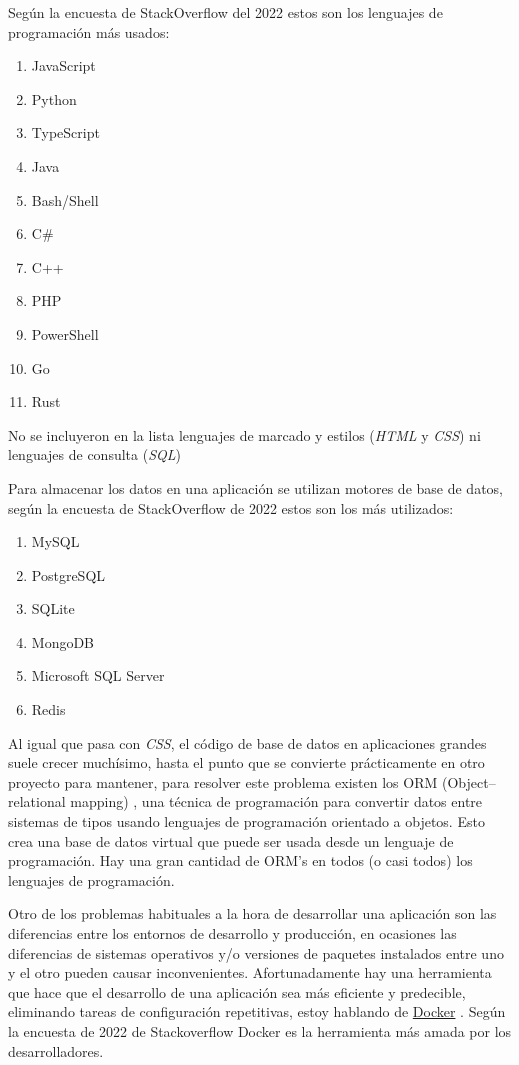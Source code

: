 Según la encuesta de StackOverflow del 2022 \cite{encuesta2022} estos son los lenguajes de programación más usados: 
\begin{enumerate}
	\item JavaScript
	\item Python
	\item TypeScript
	\item Java
	\item Bash/Shell
	\item C\#
	\item C++
	\item PHP
	\item PowerShell
	\item Go
	\item Rust
\end{enumerate}
No se incluyeron en la lista lenguajes de marcado y estilos (\textit{HTML} y \textit{CSS}) ni lenguajes de consulta (\textit{SQL})
\newline

Para almacenar los datos en una aplicación se utilizan motores de base de datos, según la encuesta de StackOverflow de 2022 \cite{encuesta2022} estos son los más utilizados:
\begin{enumerate}
	\item MySQL
	\item PostgreSQL
	\item SQLite
	\item MongoDB
	\item Microsoft SQL Server
	\item Redis
\end{enumerate}

Al igual que pasa con \textit{CSS}, el código de base de datos en aplicaciones grandes suele crecer muchísimo, hasta el punto que se convierte prácticamente en otro proyecto para mantener, para resolver este problema existen los ORM (Object–relational mapping) \cite{orm}, una técnica de programación para convertir datos entre sistemas de tipos usando lenguajes de programación orientado a objetos. Esto crea una base de datos virtual que puede ser usada desde un lenguaje de programación. Hay una gran cantidad de ORM's en todos (o casi todos) los lenguajes de programación.
\newline

Otro de los problemas habituales a la hora de desarrollar una aplicación son las diferencias entre los entornos de desarrollo y producción, en ocasiones las diferencias de sistemas operativos y/o versiones de paquetes instalados entre uno y el otro pueden causar inconvenientes. Afortunadamente hay una herramienta que hace que el desarrollo de una aplicación sea más eficiente y predecible, eliminando tareas de configuración repetitivas, estoy hablando de \href{docker.com}{Docker} \cite{docker_docs}. Según la encuesta de 2022 de Stackoverflow \cite{encuesta2022} Docker es la herramienta más amada por los desarrolladores.

